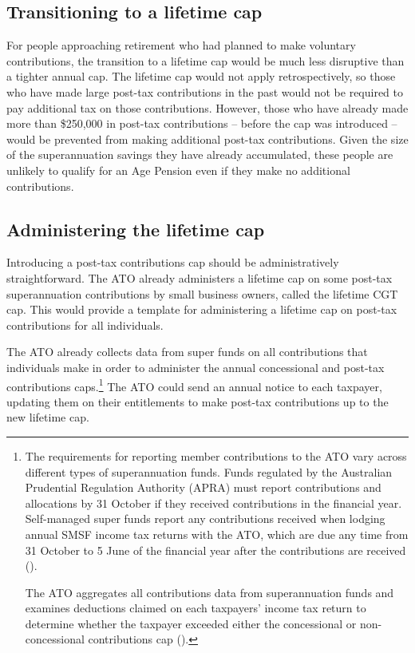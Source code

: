 \subsection{Transitioning to a lifetime cap}
For people approaching retirement who had planned to make voluntary contributions, the transition to a lifetime cap would be much less disruptive than a tighter annual cap. The lifetime cap would not apply retrospectively, so those who have made large post-tax contributions in the past would not be required to pay additional tax on those contributions. However, those who have already made more than \$250,000 in post-tax contributions – before the cap was introduced – would be prevented from making additional post-tax contributions. Given the size of the superannuation savings they have already accumulated, these people are unlikely to qualify for an Age Pension even if they make no additional contributions.

\subsection{Administering the lifetime cap}
Introducing a post-tax contributions cap should be administratively straightforward. The ATO already administers a lifetime cap on some post-tax superannuation contributions by small business owners, called the lifetime CGT cap. This would provide a template for administering a lifetime cap on post-tax contributions for all individuals.

The ATO already collects data from super funds on all contributions that individuals make in order to administer the annual concessional and post-tax contributions caps.\footnote{The requirements for reporting member contributions to the ATO vary across different types of superannuation funds. Funds regulated by the Australian Prudential Regulation Authority (APRA) must report contributions and allocations by 31 October if they received contributions in the financial year. Self-managed super funds report any contributions received when lodging annual SMSF income tax returns with the ATO, which are due any time from 31 October to 5 June of the financial year after the contributions are received (\textcite{ATO2015l}).

The ATO aggregates all contributions data from superannuation funds and examines deductions claimed on each taxpayers’ income tax return to determine whether the taxpayer exceeded either the concessional or non-concessional contributions cap  (\textcite[][12]{InspectorGeneralTaxation2014-Review-into-super-excess-contr-tax}).
}  The ATO could send an annual notice to each taxpayer, updating them on their entitlements to make post-tax contributions up to the new lifetime cap. 

